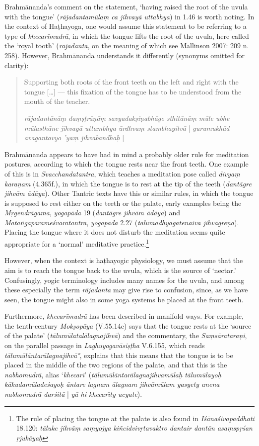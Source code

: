 \begin{ekdosis}
\begin{philcomm}[hp01_045]
Brahmānanda's comment on the statement, `having raised the root of the uvula with the tongue' (\emph{rājadantamūlaṃ ca jihvayā uttabhya}) in 1.46 is worth noting. In the context of Haṭhayoga, one would assume this statement to be referring to a type of  \emph{khecarīmudrā}, in which the tongue lifts the root of the uvula, here called the `royal tooth' (\emph{rājadanta}, on the meaning of which see Mallinson 2007: 209 n. 258). However, Brahmānanda understands it differently (synonyms omitted for clarity): 
\begin{quote}
Supporting both roots of the front teeth on the left and right with the tongue [\ldots] — this fixation of the tongue has to be understood from the mouth of the teacher.

\emph{rājadantānāṃ daṃṣṭrāṇāṃ savyadakṣiṇabhāge sthitānāṃ mūle ubhe mūlasthāne jihvayā uttambhya ūrdhvaṃ stambhayitvā} | \emph{gurumukhād avagantavyo 'yaṃ jihvābandhaḥ} |
\end{quote}
Brahmānanda appears to have had in mind a probably older rule for meditation postures, according to which the tongue rests near the front teeth. One example of this is in \emph{Svacchandatantra}, which teaches a meditation pose called \emph{divyaṃ karaṇam} (4.365f.), in which the tongue is to rest at the tip
of the teeth (\emph{dantāgre jihvām ādāya}). Other Tantric texts have this or similar rules, in which the tongue is supposed to rest either on the teeth or the palate, early examples being the \emph{Mṛgendrāgama}, \textit{yogapāda} 19 (\emph{dantāgre jihvām ādāya}) and \emph{Mataṅgapārameśvaratantra}, \textit{yogapāda} 2.27 (\emph{tālumadhyagatenaiva jihvāgreṇa}).
Placing the tongue where it does not disturb the meditation seems quite appropriate for a `normal' meditative practice.\footnote{The rule of placing the tongue at the palate is also found in \emph{Iśānaśivapaddhati} 18.120: \emph{tāluke jihvāṃ saṃyojya kiñcidvivṛtavaktro dantair dantān asaṃspṛśan ṛjukāyaḥ}}

However, when the context is haṭhayogic physiology, we must assume that the aim is to reach the tongue back to the uvula, which is the source of `nectar.' Confusingly, yogic terminology includes many names for the uvula, and among these especially the term \emph{rājadanta} may give rise to confusion, since, as we have seen, the tongue might also in some yoga systems be placed at the front teeth.

Furthermore, \emph{khecarīmudrā} has been described in manifold ways. For example, the tenth-century \emph{Mokṣopāya} (V.55.14c) says that the tongue rests at the `source of the palate' (\emph{tālumūlatalālagnajihvā}) and the commentary, the
\emph{Saṃsārataraṇi}, on the parallel passage in \emph{Laghuyogavāsiṣṭha} V.6.155, which reads \emph{tālumūlāntarālagnajihvā°}, explains that this means that the tongue is to be placed in the middle of the two regions of the palate, and that this is the \emph{nabhomudrā}, alias `\emph{khecarī}' (\emph{tālumūlāntarālagnajihvamūlaḥ tālumūlayoḥ kākudamūladeśayoḥ āntare lagnam ālagnam jihvāmūlam yasyety anena nabhomudrā darśitā} | \emph{yā hi khecarı̄ty ucyate}).


\end{philcomm}
\end{ekdosis}
